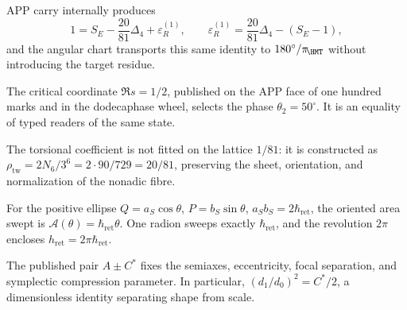 \begin{exactbox}[title={Exact closure and prospective independence}]
APP carry internally produces
\[
1=S_E-\frac{20}{81}\Delta_4+\varepsilon_R^{(1)},
\qquad
\varepsilon_R^{(1)}=\frac{20}{81}\Delta_4-(S_E-1),
\]
and the angular chart transports this same identity to
\(180^\circ/\pi_{\!\HMT}\) without introducing the target residue.
\end{exactbox}

\begin{exactbox}[title={Critical coordinate of \(50^\circ\)}]
The critical coordinate \(\Re s=1/2\), published on the APP face of one hundred
marks and in the dodecaphase wheel, selects the phase
\(\theta_2=50^\circ\). It is an equality of typed readers of the same state.
\end{exactbox}

\begin{exactbox}[title={Nonadic Bidirectional Density \(20/81\)}]
The torsional coefficient is not fitted on the lattice \(1/81\): it is constructed as
\(\rho_{\mathrm{tw}}=2N_6/3^6=2\cdot90/729=20/81\), preserving the sheet,
orientation, and normalization of the nonadic fibre.
\end{exactbox}

\begin{exactbox}[title={Areal law of the radion}]
For the positive ellipse
\(Q=a_S\cos\theta\), \(P=b_S\sin\theta\),
\(a_Sb_S=2\hbar_{\mathrm{ret}}\), the oriented area swept is
\(\mathcal A(\theta)=\hbar_{\mathrm{ret}}\theta\). One radion sweeps exactly
\(\hbar_{\mathrm{ret}}\), and the revolution \(2\pi\) encloses
\(h_{\mathrm{ret}}=2\pi\hbar_{\mathrm{ret}}\).
\end{exactbox}

\begin{exactbox}[title={Focal invariants of the positive operator}]
The published pair \(A\pm C^\ast\) fixes the semiaxes, eccentricity,
focal separation, and symplectic compression parameter. In particular,
\((d_1/d_0)^2=C^\ast/2\), a dimensionless identity separating shape from scale.
\end{exactbox}

